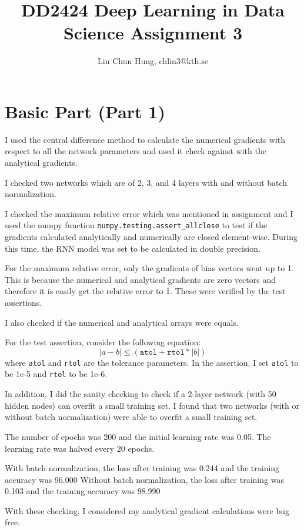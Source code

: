\documentclass[12pt]{article}
\newenvironment{question}[2][Question]{\begin{trivlist}
\kern10pt
\item[\hskip \labelsep {\bfseries #1}\hskip \labelsep {\bfseries #2.}]}{\end{trivlist}}
\begin{document}
\title{DD2424 Deep Learning in Data Science Assignment 3}
\author{Lin Chun Hung, chlin3@kth.se}

\maketitle

\section{Basic Part (Part 1)}
\begin{question}{i}
    I used the central difference method to calculate the numerical gradients
    with respect to all the network parameters and used it check against with the
    analytical gradients.

    I checked two networks which are of 2, 3, and 4 layers with and without batch normalization.

    I checked the maximum relative error which was mentioned in assignment and I
    used the numpy function \texttt{numpy.testing.assert\_allclose} to test if
    the gradients calculated analytically and numerically are closed element-wise.
    During this time, the RNN model was set to be calculated in double precision.

    For the maximum relative error, only the gradients of bias vectors went up to
    1. This is because the numerical and analytical gradients are zero vectors and
    therefore it is easily get the relative error to 1. These were verified by the
    test assertions.

    I also checked if the numerical and analytical arrays were equals.

    For the test assertion, consider the following equation:
    \begin{equation*}
        |a - b| \leq (\texttt{atol} + \texttt{rtol} * |b|)
    \end{equation*}
    where \texttt{atol} and \texttt{rtol} are the tolerance parameters.
    In the assertion, I set \texttt{atol} to be 1e-5 and \texttt{rtol} to be 1e-6.

    In addition, I did the sanity checking to check if a 2-layer network
    (with 50 hidden nodes) can overfit
    a small training set. I found that two networks (with or without batch normalization)
    were able to overfit a small training set.

    The number of epochs was 200 and the initial learning rate was 0.05. The learning
    rate was halved every 20 epochs.

    With batch normalization, the loss after training was 0.244 and the training
    accuracy was 96.000%
    Without batch normalization, the loss after training was 0.103 and the training
    accuracy was 98.990%

    With these checking, I considered my analytical gradient calculations were bug free.
\end{question}
\end{document}

